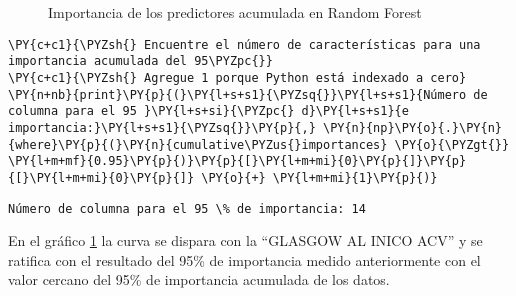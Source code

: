 \begin{center}
    	\begin{figure}[H]
	\centering
	\caption{Importancia de los predictores acumulada en Random Forest}
	\label{fig:iparf}
	\end{figure}
\end{center}

    
    \begin{tcolorbox}[breakable, size=fbox, boxrule=1pt, pad at break*=1mm,colback=cellbackground, colframe=cellborder]
\begin{Verbatim}[commandchars=\\\{\}]
\PY{c+c1}{\PYZsh{} Encuentre el número de características para una importancia acumulada del 95\PYZpc{}}
\PY{c+c1}{\PYZsh{} Agregue 1 porque Python está indexado a cero}
\PY{n+nb}{print}\PY{p}{(}\PY{l+s+s1}{\PYZsq{}}\PY{l+s+s1}{Número de columna para el 95 }\PY{l+s+si}{\PYZpc{} d}\PY{l+s+s1}{e importancia:}\PY{l+s+s1}{\PYZsq{}}\PY{p}{,} \PY{n}{np}\PY{o}{.}\PY{n}{where}\PY{p}{(}\PY{n}{cumulative\PYZus{}importances} \PY{o}{\PYZgt{}} \PY{l+m+mf}{0.95}\PY{p}{)}\PY{p}{[}\PY{l+m+mi}{0}\PY{p}{]}\PY{p}{[}\PY{l+m+mi}{0}\PY{p}{]} \PY{o}{+} \PY{l+m+mi}{1}\PY{p}{)}
\end{Verbatim}
\end{tcolorbox}

    \begin{Verbatim}[commandchars=\\\{\}]
Número de columna para el 95 \% de importancia: 14
    \end{Verbatim}

    En el gráfico \ref{fig:iparf} la curva se dispara con la
``GLASGOW AL INICO ACV'' y se ratifica con el resultado del 95\% de
importancia medido anteriormente con el valor cercano del 95\% de
importancia acumulada de los datos.

